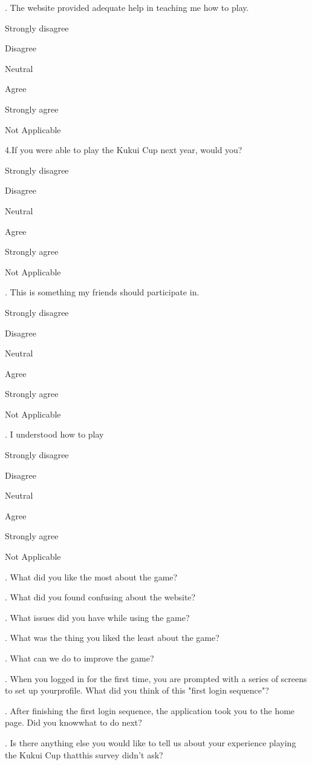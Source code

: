 . The website provided adequate help in teaching me how to play.
\begin{radiobutton}
	\item Strongly disagree
	\item Disagree
	\item Neutral
	\item Agree
	\item Strongly agree
	\item Not Applicable
\end{radiobutton}

\noindent
4.If you were able to play the Kukui Cup next year, would you?
\begin{radiobutton}
	\item Strongly disagree
	\item Disagree
	\item Neutral
	\item Agree
	\item Strongly agree
	\item Not Applicable
\end{radiobutton}

. This is something my friends should participate in.
\begin{radiobutton}
	\item Strongly disagree
	\item Disagree
	\item Neutral
	\item Agree
	\item Strongly agree
	\item Not Applicable
\end{radiobutton}

. I understood how to play
\begin{radiobutton}
	\item Strongly disagree
	\item Disagree
	\item Neutral
	\item Agree
	\item Strongly agree
	\item Not Applicable
\end{radiobutton}

. What did you like the most about the game?

. What did you found confusing about the website?

. What issues did you have while using the game?

. What was the thing you liked the least about the game?

. What can we do to improve the game?

. When you logged in for the first time, you are prompted with a series of screens to set up yourprofile.
What did you think of this "first login sequence"?

. After finishing the first login sequence, the application took you to the home page. Did you knowwhat to do next?

. Is there anything else you would like to tell us about your experience playing the Kukui Cup thatthis
survey didn't ask?
